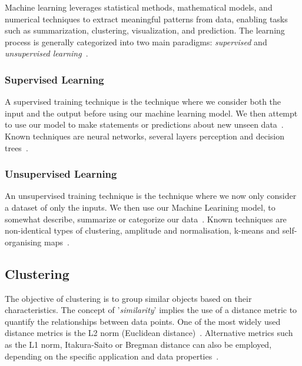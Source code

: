\documentclass[10pt,twocolumn,letterpaper]{article}
\begin{document}
Machine learning leverages statistical methods, mathematical models, and
numerical techniques to extract meaningful patterns from data, enabling tasks
such as summarization, clustering, visualization, and prediction. The learning
process is generally categorized into two main paradigms: \textit{supervised}
and \textit{unsupervised learning}~\cite{deuschle2019}.


\subsubsection{Supervised Learning}\label{subsubsec:supervised-learning}

A supervised training technique is the technique where we consider both the
input and the output before using our machine learning model. We then attempt
to use our model to make statements or predictions about new unseen
data~\cite{deuschle2019}. Known techniques are neural networks, several layers
perception and decision trees~\cite{kushawahAndYadav2016}.


\subsubsection{Unsupervised Learning}\label{subsubsec:unsupervised-learning}

An unsupervised training technique is the technique where we now only consider
a dataset of only the inputs. We then use our Machine Learining model, to
somewhat describe, summarize or categorize our data~\cite{deuschle2019}. Known
techniques are non-identical types of clustering, amplitude and normalisation,
k-means and self-organising maps~\cite{kushawahAndYadav2016}.


\subsection{Clustering}\label{subsec:clustering}

The objective of clustering is to group similar objects based on their
characteristics. The concept of '\textit{similarity}' implies the use of a
distance metric to quantify the relationships between data points. One of the
most widely used distance metrics is the L2 norm (Euclidean
distance)~\cite{deuschle2019}. Alternative metrics such as the L1 norm,
Itakura-Saito or Bregman distance can also be employed, depending on the
specific application and data properties~\cite{Jain2010651}.
\end{document}
